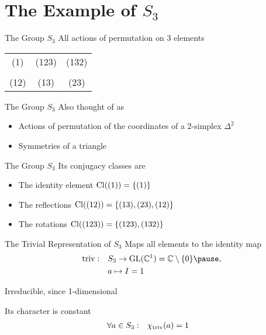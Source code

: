 
\section{The Example of $S_3$}

\begin{frame}{The Group $S_3$}
    \large
    All actions of permutation on $3$ elements

    \pause
    \vspace{2em}
    \centering
    \begin{tabular}{c c c}
        (1)  & (123) & (132) \\\\
        (12) & (13)  & (23)
    \end{tabular}
\end{frame}

\begin{frame}{The Group $S_3$}
    Also thought of as
    
    \pause
    \vspace{1em}
    \begin{itemize}
        \item Actions of permutation of the coordinates of a 2-simplex $\Delta^2$
            \pause
        \item Symmetries of a triangle
    \end{itemize}
\end{frame}

\begin{frame}{The Group $S_3$}
    \large
    Its conjugacy classes are

    \pause
    \vspace{1em}
    \begin{itemize}
        \item The identity element \hspace*{\fill} $\operatorname{Cl}((1)) = \{(1)\}$
            \pause
        \item The reflections \hspace*{\fill} $\operatorname{Cl}((12)) = \{(13), (23), (12)\}$
            \pause
        \item The rotations \hspace*{\fill} $\operatorname{Cl}((123)) = \{(123), (132)\}$
    \end{itemize}
\end{frame}

\begin{frame}{The Trivial Representation of $S_3$}
    \large
    Maps all elements to the identity map
    \pause
    \begin{align*}
        \triv: \quad & S_3 \to \GL(\C^1) = \C \setminus \{0\} \pause , \\
        & a \mapsto I = 1
    \end{align*}

    \pause
    Irreducible, since 1-dimensional

    \pause
    Its character is constant
    \begin{align*}
        \forall a \in S_3: \quad & \chi_{\operatorname{triv}}(a) = 1
    \end{align*}
\end{frame}

